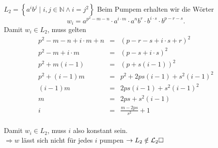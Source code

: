 \documentclass[]{beamer}
\begin{document}
\begin{frame}[squeeze]{}
  \vspace*{-0.25em}
  \begin{exampleblock}{$L_2 = \left\{ a^i b^j \;|\; i, j \in \mathbb{N} \wedge i = j^2 \right\}$}
  Beim Pumpem erhalten wir die Wörter
  \[w_i = a^{p^2-m-n} \cdot a^{i \cdot m} \cdot a^nb^r \cdot b^{i \cdot s} \cdot b^{p-r-s}.\]
  \pause
  Damit $w_i \in L_2$, muss gelten
  \vspace*{-0.25em}
  \begin{eqnarray*}
    p^2-m-n + i \cdot m + n    & = & \left( p-r-s + i \cdot s + r \right)^2 \\
    p^2-m + i \cdot m          & = & \left( p-s + i \cdot s \right)^2 \\
    p^2 + m \left( i-1 \right) & = & \left( p + s \left( i-1 \right) \right)^2 \\
    p^2 + \left( i-1 \right) m & = & p^2 + 2ps \left( i-1 \right) + s^2 \left( i-1 \right)^2 \\
    \left( i-1 \right) m       & = & 2ps \left( i-1 \right) + s^2 \left( i-1 \right)^2 \\
    m                          & = & 2ps + s^2 \left( i-1 \right) \\
    i                          & = & \frac{m - 2ps}{s^2} + 1
  \end{eqnarray*} \\
  \vspace*{-0.25em}
  Damit $w_i \in L_2$, muss $i$ also konstant sein. \\
  $\Rightarrow w$ lässt sich nicht für jedes $i$ pumpen $\to L_2 \notin \mathcal{L}_2 \hfill \square$
  \end{exampleblock}
\end{frame}
\end{document}
